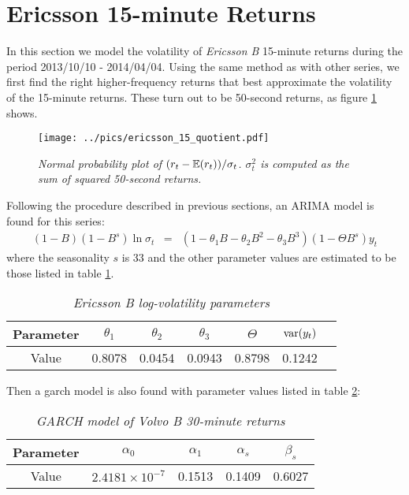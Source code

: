 \section{Ericsson 15-minute Returns}
\label{sec:ericsson_15min}
In this section we model the volatility of {\it Ericsson B}
15-minute returns during the period 2013/10/10 - 2014/04/04.
Using the same method as with other series, we first find the right
higher-frequency returns that best approximate the volatility of the
15-minute returns. These turn out to be 50-second returns, as figure
\ref{fig:ericsson_15_quotient} shows.
\begin{figure}[htb!]
  \centering
  \texttt{[image: ../pics/ericsson\_15\_quotient.pdf]}
  \caption{\small \it Normal probability plot of $(r_t -\mathbb{E}(r_t))/
    \sigma_t$. $\sigma_t^2$ is computed as the sum of squared
    50-second returns.}
  \label{fig:ericsson_15_quotient}
\end{figure}

Following the procedure described in previous sections, an ARIMA model is
found for this series:
\begin{eqnarray*}
  (1-B)(1-B^s) \ln\sigma_t &=& (1- \theta_1B - \theta_2B^2 -
  \theta_3B^3)(1 - \Theta B^s) y_t
\end{eqnarray*}
where the seasonality $s$ is 33 and the other parameter values are
estimated to be those listed in table \ref{tab:ericsson_15_params}.
\begin{table}[htb!]
  \centering
  \begin{tabular}{|c|c|c|c|c|c|c|}
    \hline
    Parameter & $\theta_1$ & $\theta_2$ & $\theta_3$ & $\Theta$ &
    $\text{var}(y_t)$ \\
    \hline
    Value & 0.8078 & 0.0454 & 0.0943 & 0.8798 & 0.1242 \\
    \hline
  \end{tabular}
  \caption{\small \it Ericsson B log-volatility parameters}
  \label{tab:ericsson_15_params}
\end{table}

Then a \gls{garch} model is also found with parameter values listed in
table \ref{tab:ericsson_15_garch_params}:
\begin{table}[htb!]
  \centering
  \begin{tabular}{|c|c|c|c|c|}
    \hline
    Parameter & $\alpha_0$ & $\alpha_1$ & $\alpha_{s}$ & $\beta_{s}$ \\
    \hline
    Value & $2.4181 \times 10^{-7}$ & 0.1513 & 0.1409 & 0.6027 \\
    \hline
  \end{tabular}
  \caption{\small \it GARCH model of Volvo B 30-minute returns}
  \label{tab:ericsson_15_garch_params}
\end{table}


